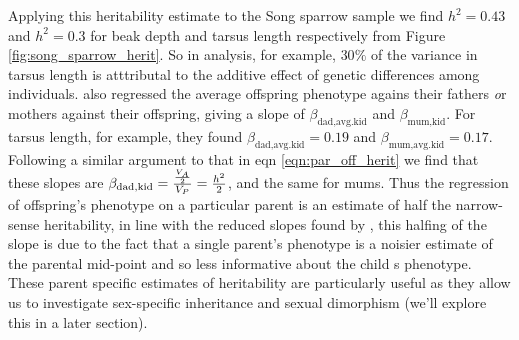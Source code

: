 Applying this heritability estimate to the Song sparrow sample we find
$h^2=0.43$ and $h^2=0.3$ for beak depth and tarsus length
respectively from Figure
\ref{fig:song_sparrow_herit}. So in \citet{smith1979heritability} analysis, for example,
$30\%$ of the variance in tarsus length is atttributal to the additive
effect of genetic
differences among individuals. 
\citet{smith1979heritability} also regressed the average offspring
phenotype agains their fathers {\emph or} mothers against their
offspring, giving a slope of $\beta_{\textrm{dad}, \textrm{avg.kid}}$ and
$\beta_{\textrm{mum}, \textrm{kid}}$. For tarsus length, for
example, they found $\beta_{\textrm{dad},
  \textrm{avg.kid}}= 0.19$ and $\beta_{\textrm{mum},
  \textrm{avg.kid}}= 0.17$.  Following a similar argument to
that in eqn
\eqref{eqn:par_off_herit} we find that these slopes are $\beta_{\textrm{dad}, \textrm{kid}}=
\nicefrac{\nicefrac{V_{A}}{2}}{V_P} = \nicefrac{h^2}{2}$, and the same
  for mums. Thus the regression of offspring's phenotype on a
  particular parent is an estimate of half the narrow-sense
  heritability, in line with the reduced slopes found by
  \citet{smith1979heritability}, this halfing of the slope is due to the
  fact that a single parent's phenotype is a noisier estimate of the
  parental mid-point and so less informative about the child
  s phenotype. These parent specific estimates of heritability are
  particularly useful as they allow us to investigate sex-specific inheritance and sexual
  dimorphism (we'll explore this in a later section). 


